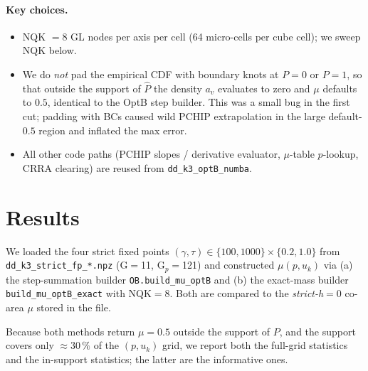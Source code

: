 \documentclass[10pt]{article}
\begin{document}
\paragraph{Key choices.}
\begin{itemize}
  \item NQK $=8$ GL nodes per axis per cell (64 micro-cells per cube cell);
        we sweep NQK below.
  \item We do \emph{not} pad the empirical CDF with boundary knots at
        $P=0$ or $P=1$, so that outside the support of $\widehat P$ the
        density $a_v$ evaluates to zero and $\mu$ defaults to $0.5$,
        identical to the OptB step builder. This was a small bug in the
        first cut; padding with BCs caused wild PCHIP extrapolation in the
        large default-$0.5$ region and inflated the max error.
  \item All other code paths (PCHIP slopes / derivative evaluator,
        $\mu$-table $p$-lookup, CRRA clearing) are reused from
        \texttt{dd\_k3\_optB\_numba}.
\end{itemize}

\section{Results}

We loaded the four strict fixed points
$(\gamma,\tau)\in\{100,1000\}\times\{0.2,1.0\}$ from
\verb|dd_k3_strict_fp_*.npz| (G$=$11, G$_p=$121) and constructed
$\mu(p,u_k)$ via (a) the step-summation builder
\texttt{OB.build\_mu\_optB} and (b) the exact-mass builder
\texttt{build\_mu\_optB\_exact} with NQK$=8$. Both are compared to the
\emph{strict-h$=0$} co-area $\mu$ stored in the file.

Because both methods return $\mu=0.5$ outside the support of $P$, and the
support covers only $\approx 30\,\%$ of the $(p,u_k)$ grid, we report both
the full-grid statistics and the in-support statistics; the latter are the
informative ones.
\end{document}
